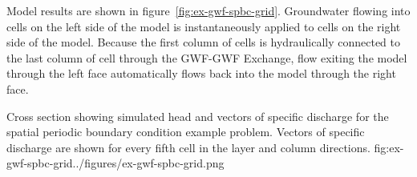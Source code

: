 Model results are shown in figure~\ref{fig:ex-gwf-spbc-grid}.  Groundwater flowing into cells on the left side of the model is instantaneously applied to cells on the right side of the model.   Because the first column of cells is hydraulically connected to the last column of cell through the GWF-GWF Exchange, flow exiting the model through the left face automatically flows back into the model through the right face.

\begin{StandardFigure}{
                                     Cross section showing simulated head and vectors of specific discharge for the spatial periodic boundary condition example problem.  Vectors of specific discharge are shown for every fifth cell in the layer and column directions.
                                     }{fig:ex-gwf-spbc-grid}{../figures/ex-gwf-spbc-grid.png}
\end{StandardFigure}                                 
